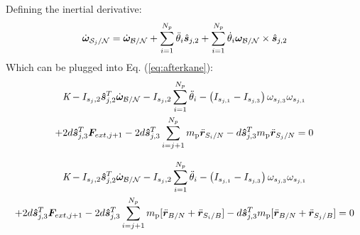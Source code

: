 \documentclass[paper]{aiaaNew}
\begin{document}
Defining the inertial derivative:
\begin{equation}
\dot{\bm \omega}_{\mathcal{S}_{j}/\mathcal{N}} = \dot{\bm \omega}_{\cal{B/N}} + \sum^{N_p}_{i=1}\ddot{\theta}_{i} \hat{\bm s}_{j,2} + \sum^{N_p}_{i=1}\dot{\theta}_{i} \bm \omega_{\cal{B/N}} \times \hat{\bm s}_{j,2}
\end{equation}
Which can be plugged into Eq. (\ref{eq:afterkane}):
\begin{multline}
\textit{K} - I_{s_j,2} \bm{\hat{s}}_{j,2}^T \dot{\bm\omega}_{\cal B/N} - I_{s_j,2} \sum^{N_p}_{i=1}\ddot{\theta}_i - \left( I_{s_{j,1}} - I_{s_{j,3}}\right) \omega_{s_{j,3}} \omega_{s_{j,1}}\\
+ 2d\bm{\hat{s}}^{T}_{j,3}\bm F_{ext,j+1} - 2d\bm{\hat{s}}^{T}_{j,3}\sum^{N_p}_{i=j+1}m_{\text{p}} \ddot{\bm r}_{S_{i}/N} - d\bm{\hat{s}}^{T}_{j,3} m_{\text{p}} \ddot{\bm r}_{S_{j}/N} = 0 %
\end{multline}

\begin{multline}
\textit{K} - I_{s_j,2} \bm{\hat{s}}_{j,2}^T \dot{\bm\omega}_{\cal B/N} - I_{s_j,2} \sum^{N_p}_{i=1}\ddot{\theta}_i - \left( I_{s_{j,1}} - I_{s_{j,3}}\right) \omega_{s_{j,3}} \omega_{s_{j,1}}\\
+ 2d\bm{\hat{s}}^{T}_{j,3}\bm F_{ext,j+1} - 2d\bm{\hat{s}}^{T}_{j,3}\sum^{N_p}_{i=j+1}m_{\text{p}} [\ddot{\bm r}_{B/N} + \ddot{\bm r}_{S_{i}/B}] - d\bm{\hat{s}}^{T}_{j,3} m_{\text{p}} [\ddot{\bm r}_{B/N} + \ddot{\bm r}_{S_{j}/B}] = 0 %
\end{multline}
\end{document}
